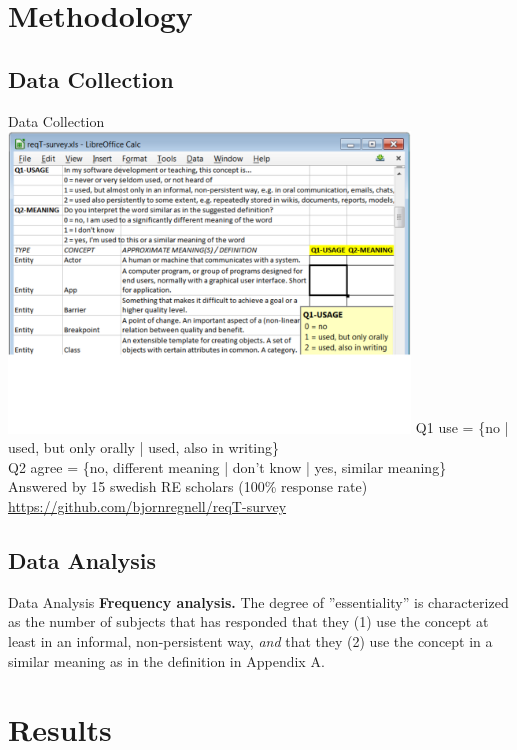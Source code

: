 \documentclass{slides}
\begin{document}
\section{Methodology}
\subsection{Data Collection}
\begin{Slide}{Data Collection}
{\centering
\includegraphics[width=0.8\textwidth]{img/survey-screen-dump}
}
{\small Q1 use =   \{no | used, but only orally | used, also in writing\}\\ Q2 agree = \{no, different meaning | don't know | yes, similar meaning\}  \\
Answered by 15 swedish RE scholars (100\% response rate)\\
\url{https://github.com/bjornregnell/reqT-survey}
}

\end{Slide}

\subsection{Data Analysis}
\begin{Slide}{Data Analysis}
\textbf{Frequency analysis.} The degree of ''essentiality'' is characterized as the number of subjects that has responded that they (1) use the concept at least in an informal, non-persistent way, \textit{and} that they (2) use the concept in a similar meaning as in the definition in Appendix A. 


\end{Slide}

\section{Results}
\end{document}
